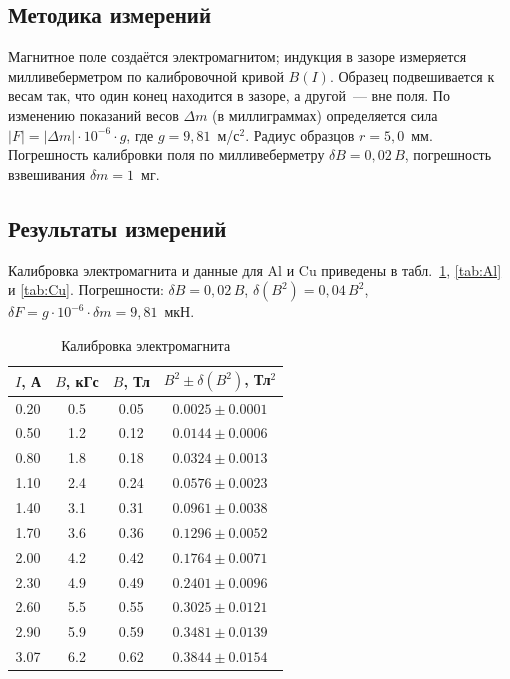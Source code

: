 \documentclass[a4paper,12pt]{article}
\begin{document}
	\subsection{Методика измерений}
	Магнитное поле создаётся электромагнитом; индукция в зазоре измеряется милливеберметром по калибровочной кривой $B(I)$. Образец подвешивается к весам так, что один конец находится в зазоре, а другой~--- вне поля. По изменению показаний весов $\Delta m$ (в миллиграммах) определяется сила $|F| = |\Delta m| \cdot 10^{-6} \cdot g$, где $g = 9{,}81$~м/с$^2$. Радиус образцов $r = 5{,}0$~мм. Погрешность калибровки поля по милливеберметру $\delta B = 0{,}02\,B$, погрешность взвешивания $\delta m = 1$~мг.
	
	\subsection{Результаты измерений}
	Калибровка электромагнита и данные для Al и Cu приведены в табл.~\ref{tab:calib}, \ref{tab:Al} и \ref{tab:Cu}. Погрешности: $\delta B = 0{,}02\,B$, $\delta(B^2) = 0{,}04\,B^2$, $\delta F = g \cdot 10^{-6} \cdot \delta m = 9{,}81$~мкН.
	
	\begin{table}[H]
		\centering
		\caption{Калибровка электромагнита}
		\label{tab:calib}
		\begin{tabular}{cccc}
			\toprule
			$I$, А & $B$, кГс & $B$, Тл & $B^2 \pm \delta(B^2)$, Тл$^2$ \\
			\midrule
			0.20 & 0.5 & 0.05 & $0.0025 \pm 0.0001$ \\
			0.50 & 1.2 & 0.12 & $0.0144 \pm 0.0006$ \\
			0.80 & 1.8 & 0.18 & $0.0324 \pm 0.0013$ \\
			1.10 & 2.4 & 0.24 & $0.0576 \pm 0.0023$ \\
			1.40 & 3.1 & 0.31 & $0.0961 \pm 0.0038$ \\
			1.70 & 3.6 & 0.36 & $0.1296 \pm 0.0052$ \\
			2.00 & 4.2 & 0.42 & $0.1764 \pm 0.0071$ \\
			2.30 & 4.9 & 0.49 & $0.2401 \pm 0.0096$ \\
			2.60 & 5.5 & 0.55 & $0.3025 \pm 0.0121$ \\
			2.90 & 5.9 & 0.59 & $0.3481 \pm 0.0139$ \\
			3.07 & 6.2 & 0.62 & $0.3844 \pm 0.0154$ \\
			\bottomrule
		\end{tabular}
	\end{table}
	
\end{document}
